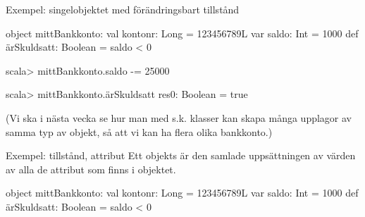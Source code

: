 \begin{Slide}{Exempel: singelobjektet med förändringsbart tillstånd} \SlideFontSmall
\begin{Code}[basicstyle=\ttfamily\fontsize{9}{11}\selectfont]
object mittBankkonto:
  val kontonr: Long        = 123456789L
  var saldo: Int           = 1000
  def ärSkuldsatt: Boolean = saldo < 0
\end{Code}
\begin{REPLnonum}
scala> mittBankkonto.saldo -= 25000

scala> mittBankkonto.ärSkuldsatt
res0: Boolean = true
\end{REPLnonum}

(Vi ska i nästa vecka se hur man med s.k. klasser kan skapa många upplagor av samma  typ av objekt, så att vi kan ha flera olika bankkonto.)
\end{Slide}



\begin{Slide}{Exempel: tillstånd, attribut}
Ett objekts  är den samlade uppsättningen av värden av alla de attribut som finns i objektet.
\begin{Code}[basicstyle=\ttfamily\fontsize{9}{11}\selectfont]
object mittBankkonto:
  val kontonr: Long        = 123456789L
  var saldo: Int           = 1000
  def ärSkuldsatt: Boolean = saldo < 0
\end{Code}
\end{Slide}



